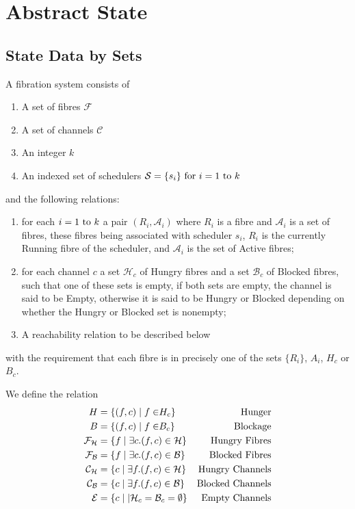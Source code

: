 \documentclass{article}
\begin{document}
\section{Abstract State}
\subsection{State Data by Sets}
A fibration system consists of 
\begin{enumerate}
\item A set of fibres $\mathcal F$
\item A set of channels $\mathcal C$
\item An integer $k$
\item An indexed set of schedulers $\mathcal S= \{s_i\}{\rm\ for\ }i=1 {\rm\ to\ }k$  
\end{enumerate}
and the following relations:
\begin{enumerate}
\item for each $i=1 {\rm\ to\ }k$ a pair $(R_i, \mathcal A_i)$ where $R_i$ is a fibre
and $\mathcal A_i$ is a set of fibres, these fibres being associated with
scheduler $s_i$, $R_i$ is the currently Running fibre of the scheduler,
and $\mathcal A_i$ is the set of Active fibres;
\item for each channel $c$ a set $\mathcal H_c$ of Hungry fibres
and a set $\mathcal B_c$ of Blocked fibres, such that one of these sets
is empty, if both sets are empty, the channel is said to be Empty,
otherwise it is said to be Hungry or Blocked depending on whether
the Hungry or Blocked set is nonempty;

\item A reachability relation to be described below
\end{enumerate}
with the requirement that each fibre is in precisely one of the sets $\{R_i\}$,
$A_i$, $H_c$ or $B_c$.

We define the relation 
\begin{align}
\mathrel H &= \{(f,c) \mid f \in \mathrel H_c\}&\rm Hunger\\
\mathrel B &= \{(f,c) \mid f \in \mathrel B_c\}&\rm Blockage\\
\mathcal F_{\mathcal H} &= \{f \mid \exists c . (f,c) \in \mathcal H\}&\rm Hungry\ Fibres\\
\mathcal F_{\mathcal B} &= \{f \mid \exists c . (f,c) \in \mathcal B\}&\rm Blocked\ Fibres\\
\mathcal C_{\mathcal H} &= \{ c \mid \exists f . (f,c) \in \mathcal H\}&\rm Hungry\ Channels\\
\mathcal C_{\mathcal B} &= \{ c \mid \exists f . (f,c) \in \mathcal B\}&\rm Blocked\ Channels\\
\mathcal E &= \{c \mid | \mathcal H_c = \mathcal B_c = \emptyset \}&\rm Empty\ Channels
\end{align}
\end{document}
